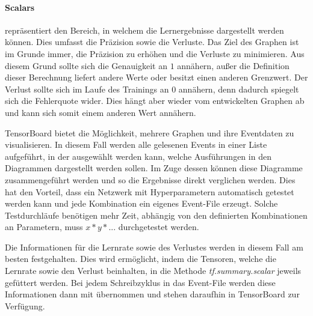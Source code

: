 \paragraph{Scalars} repräsentiert den Bereich, in welchem die Lernergebnisse dargestellt werden können. 
Dies umfasst die Präzision sowie die Verluste. 
Das Ziel des Graphen ist im Grunde immer, die Präzision zu erhöhen und die Verluste zu minimieren. 
Aus diesem Grund sollte sich die Genauigkeit an $1$ annähern, außer die Definition dieser Berechnung liefert andere Werte oder besitzt einen anderen Grenzwert. 
Der Verlust sollte sich im Laufe des Trainings an $0$ annähern, denn dadurch spiegelt sich die Fehlerquote wider. 
Dies hängt aber wieder vom entwickelten Graphen ab und kann sich somit einem anderen Wert annähern.
\phantom \newline

\noindent
TensorBoard bietet die Möglichkeit, mehrere Graphen und ihre Eventdaten zu visualisieren. 
In diesem Fall werden alle gelesenen Events in einer Liste aufgeführt, in der ausgewählt werden kann, welche Ausführungen in den Diagrammen dargestellt werden sollen. 
Im Zuge dessen können diese Diagramme zusammengeführt werden und so die Ergebnisse direkt verglichen werden. 
Dies hat den Vorteil, dass ein Netzwerk mit Hyperparametern automatisch getestet werden kann und jede Kombination ein eigenes Event-File erzeugt. 
Solche Testdurchläufe benötigen mehr Zeit, abhängig von den definierten Kombinationen an Parametern, muss $x * y * ...$ durchgetestet werden. \phantom \newline

\noindent
Die Informationen für die Lernrate sowie des Verlustes werden in diesem Fall am besten festgehalten. 
Dies wird ermöglicht, indem die Tensoren, welche die Lernrate sowie den Verlust beinhalten, in die Methode \textit{tf.summary.scalar} jeweils gefüttert werden. 
Bei jedem Schreibzyklus in das Event-File werden diese Informationen dann mit übernommen und stehen daraufhin in TensorBoard zur Verfügung.

